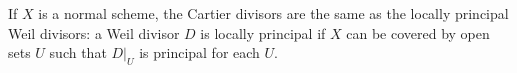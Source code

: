 If $X$ is a normal scheme, the Cartier divisors are the same as the locally principal Weil divisors: a Weil divisor $D$ is locally principal if $X$ can be covered by open sets $U$ such that $D|_U$ is principal for each $U$.
